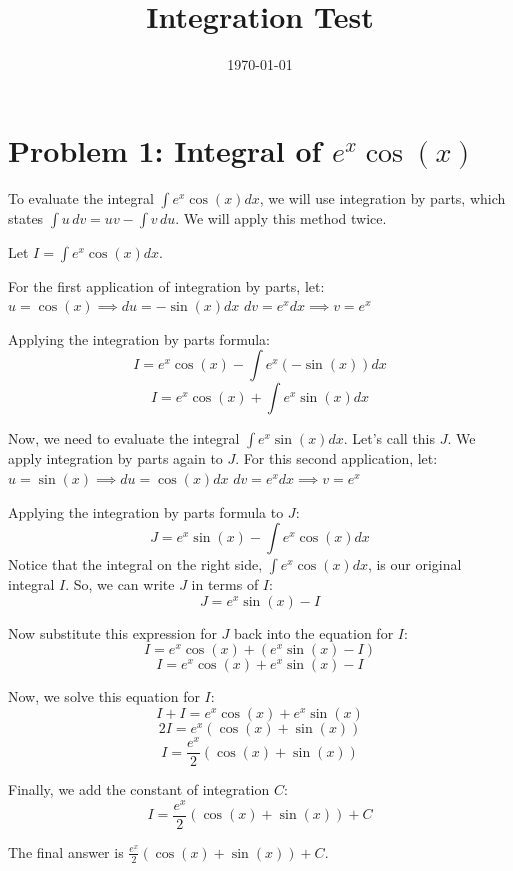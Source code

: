 \documentclass{article}
\title{Integration Test}
\date{\today}
\begin{document}
\maketitle
\section*{Problem 1: Integral of $e^x \cos(x)$}
To evaluate the integral $\int e^x \cos(x) dx$, we will use integration by parts, which states $\int u \, dv = uv - \int v \, du$. We will apply this method twice.

Let $I = \int e^x \cos(x) dx$.

For the first application of integration by parts, let:
$u = \cos(x) \implies du = -\sin(x) dx$
$dv = e^x dx \implies v = e^x$

Applying the integration by parts formula:
\[ I = e^x \cos(x) - \int e^x (-\sin(x)) dx \]
\[ I = e^x \cos(x) + \int e^x \sin(x) dx \]

Now, we need to evaluate the integral $\int e^x \sin(x) dx$. Let's call this $J$. We apply integration by parts again to $J$.
For this second application, let:
$u = \sin(x) \implies du = \cos(x) dx$
$dv = e^x dx \implies v = e^x$

Applying the integration by parts formula to $J$:
\[ J = e^x \sin(x) - \int e^x \cos(x) dx \]
Notice that the integral on the right side, $\int e^x \cos(x) dx$, is our original integral $I$.
So, we can write $J$ in terms of $I$:
\[ J = e^x \sin(x) - I \]

Now substitute this expression for $J$ back into the equation for $I$:
\[ I = e^x \cos(x) + (e^x \sin(x) - I) \]
\[ I = e^x \cos(x) + e^x \sin(x) - I \]

Now, we solve this equation for $I$:
\[ I + I = e^x \cos(x) + e^x \sin(x) \]
\[ 2I = e^x (\cos(x) + \sin(x)) \]
\[ I = \frac{e^x}{2} (\cos(x) + \sin(x)) \]

Finally, we add the constant of integration $C$:
\[ I = \frac{e^x}{2} (\cos(x) + \sin(x)) + C \]

The final answer is $\boxed{\frac{e^x}{2}(\cos(x) + \sin(x)) + C}$.
\end{document}
